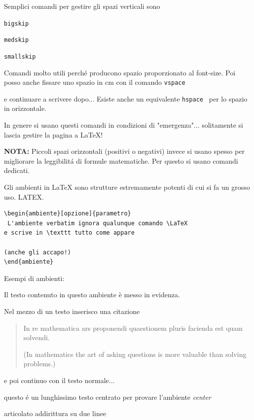 \documentclass[12pt]{article}
\begin{document}
Semplici comandi per gestire gli spazi verticali sono

\bigskip
{\tt	bigskip }

\medskip
{\tt medskip}

\smallskip
{\tt smallskip}

Comandi molto utili perch\'e producono spazio proporzionato al font-size. Poi posso anche fissare uno spazio in cm con il comando {\tt vspace	}
\vspace{5cm}

e continuare a scrivere dopo... Esiste anche un equivalente {\tt hspace	} \hspace{2cm} per lo spazio in orizzontale.

In genere si usano questi comandi in condizioni di "emergenza"... solitamente si lascia gestire la pagina a \LaTeX!

{\bf NOTA:} Piccoli spazi orizzontali (positivi o negativi) invece si usano spesso per migliorare la leggibilit\'a di formule matematiche. Per questo si usano comandi dedicati.
\newpage

Gli ambienti in \LaTeX {} sono strutture estremamente potenti di cui si fa un grosso uso.
LATEX.


 

\begin{verbatim}
\begin{ambiente}[opzione]{parametro}
 L'ambiente verbatim ignora qualunque comando \LaTeX 
e scrive in \texttt tutto come appare 

(anche gli accapo!)
\end{ambiente}
\end{verbatim}

Esempi di ambienti:

\begin{em}
Il testo contenuto in questo ambiente \`e messo in evidenza.
\end{em}

\bigskip
Nel mezzo di un testo inserisco una citazione
\begin{quote}
In re mathematica ars proponendi quaestionem 
pluris facienda est quam solvendi.

(In mathematics the art of asking questions 
is more valuable than solving problems.)
\end{quote}
e poi continuo con il testo normale...

\bigskip

\begin{center}
questo \'e un lunghissimo testo centrato per provare l'ambiente {\it center}

articolato addirittura su due linee
\end{center}
\end{document}
